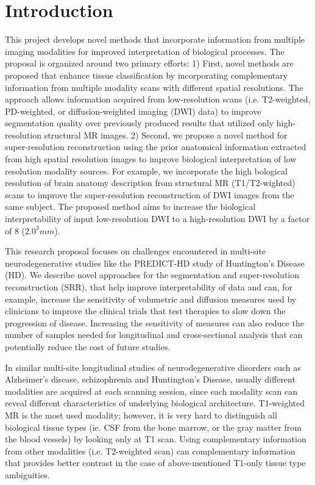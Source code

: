 
\section{Introduction}
\label{section:Introduction}

This project develops novel methods that incorporate information from multiple imaging modalities for improved interpretation of biological processes.  The proposal is organized around two primary efforts:
%
1) First, novel methods are proposed that enhance tissue classification by incorporating complementary information from multiple modality scans with different spatial resolutions.  The approach allows information acquired from low-resolution scans (i.e. T2-weighted, PD-weighted, or diffusion-weighted imaging (DWI) data) to improve segmentation quality over previously produced results that utilized only high-resolution structural MR images.
%
2) Second, we propose a novel method for super-resolution reconstruction using the prior anatomical information extracted from high spatial resolution images to improve biological interpretation of low resolution  modality sources.  For example, we incorporate the high bological resolution of brain anatomy description from structural MR (T1/T2-wighted) scans to improve the super-resolution reconstruction of DWI images from the same subject. The proposed method aims to increase the biological interpretability of input low-resolution DWI to a high-resolution DWI by a factor of 8 ($2.0^{3}mm$).

This research proposal focuses on challenges encountered in multi-site neurodegenerative studies like the PREDICT-HD \cite{PREDICTHD} study of Huntington's Disease (HD).  We describe novel approaches for the segmentation and super-resolution reconstruction (SRR), that help improve interpretability of data and can, for example, increase the sensitivity of volumetric and diffusion measures used by clinicians to improve the clinical trials that test therapies to slow down the progression of disease. Increasing the sensitivity of measures can also reduce the number of samples needed for longitudinal and cross-sectional analysis that can potentially reduce the cost of future studies. 

In similar multi-site longitudinal studies of neurodegenerative disorders such as Alzheimer's disease, schizophrenia and Huntington's Disease, usually different modalities are acquired at each scanning session, since each modality scan can reveal different characteristics of underlying biological architecture. T1-weighted MR is the most used modality; however, it is very hard to distinguish all biological tissue types (ie. CSF from the bone marrow, or the gray matter from the blood vessels) by looking only at T1 scan. Using complementary information from other modalities (i.e. T2-weighted scan) can complementary information that provides better contrast in the case of above-mentioned T1-only tissue type ambiguities.

